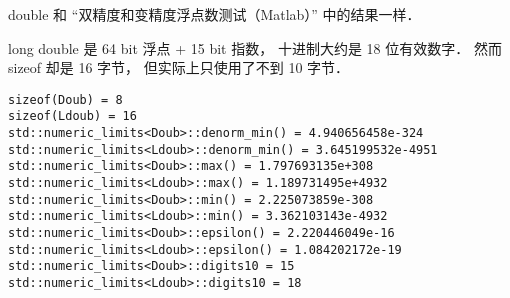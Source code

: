 

double 和 “双精度和变精度浮点数测试（Matlab）” 中的结果一样．

long double 是 64 bit 浮点 + 15 bit 指数， 十进制大约是 18 位有效数字． 然而 sizeof 却是 16 字节， 但实际上只使用了不到 10 字节．

\begin{lstlisting}
sizeof(Doub) = 8
sizeof(Ldoub) = 16
std::numeric_limits<Doub>::denorm_min() = 4.940656458e-324
std::numeric_limits<Ldoub>::denorm_min() = 3.645199532e-4951
std::numeric_limits<Doub>::max() = 1.797693135e+308
std::numeric_limits<Ldoub>::max() = 1.189731495e+4932
std::numeric_limits<Doub>::min() = 2.225073859e-308
std::numeric_limits<Ldoub>::min() = 3.362103143e-4932
std::numeric_limits<Doub>::epsilon() = 2.220446049e-16
std::numeric_limits<Ldoub>::epsilon() = 1.084202172e-19
std::numeric_limits<Doub>::digits10 = 15
std::numeric_limits<Ldoub>::digits10 = 18
\end{lstlisting}
